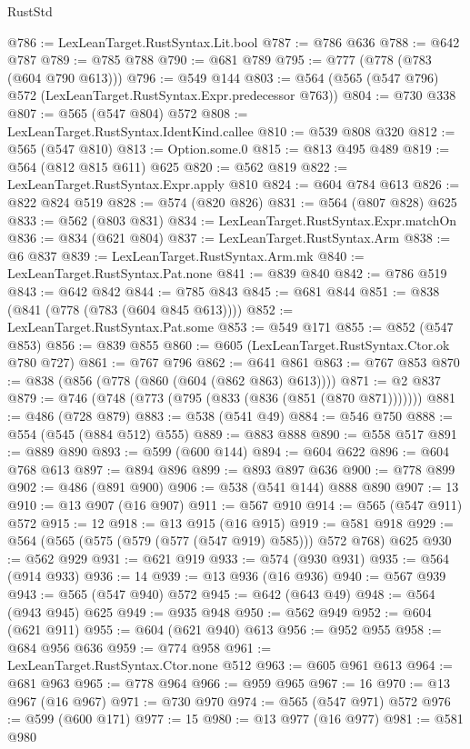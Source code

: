 \begin{lexlean}{RustStd}
\begin{coremodule}
{\begin{coremodule}
{{{{{{{{{{{{{@786 := LexLeanTarget.RustSyntax.Lit.bool
@787 := @786 @636
@788 := @642 @787
@789 := @785 @788
@790 := @681 @789
@795 := @777 (@778 (@783 (@604 @790 @613)))
@796 := @549 @144
@803 := @564 (@565 (@547 @796) @572 (LexLeanTarget.RustSyntax.Expr.predecessor @763))
@804 := @730 @338
@807 := @565 (@547 @804) @572
@808 := LexLeanTarget.RustSyntax.IdentKind.callee
@810 := @539 @808 @320
@812 := @565 (@547 @810)
@813 := Option.some.{0}
@815 := @813 @495 @489
@819 := @564 (@812 @815 @611) @625
@820 := @562 @819
@822 := LexLeanTarget.RustSyntax.Expr.apply @810
@824 := @604 @784 @613
@826 := @822 @824 @519
@828 := @574 (@820 @826)
@831 := @564 (@807 @828) @625
@833 := @562 (@803 @831)
@834 := LexLeanTarget.RustSyntax.Expr.matchOn
@836 := @834 (@621 @804)
@837 := LexLeanTarget.RustSyntax.Arm
@838 := @6 @837
@839 := LexLeanTarget.RustSyntax.Arm.mk
@840 := LexLeanTarget.RustSyntax.Pat.none
@841 := @839 @840
@842 := @786 @519
@843 := @642 @842
@844 := @785 @843
@845 := @681 @844
@851 := @838 (@841 (@778 (@783 (@604 @845 @613))))
@852 := LexLeanTarget.RustSyntax.Pat.some
@853 := @549 @171
@855 := @852 (@547 @853)
@856 := @839 @855
@860 := @605 (LexLeanTarget.RustSyntax.Ctor.ok @780 @727)
@861 := @767 @796
@862 := @641 @861
@863 := @767 @853
@870 := @838 (@856 (@778 (@860 (@604 (@862 @863) @613))))
@871 := @2 @837
@879 := @746 (@748 (@773 (@795 (@833 (@836 (@851 (@870 @871)))))))
@881 := @486 (@728 @879)
@883 := @538 (@541 @49)
@884 := @546 @750
@888 := @554 (@545 (@884 @512) @555)
@889 := @883 @888
@890 := @558 @517
@891 := @889 @890
@893 := @599 (@600 @144)
@894 := @604 @622
@896 := @604 @768 @613
@897 := @894 @896
@899 := @893 @897 @636
@900 := @778 @899
@902 := @486 (@891 @900)
@906 := @538 (@541 @144) @888 @890
@907 := 13
@910 := @13 @907 (@16 @907)
@911 := @567 @910
@914 := @565 (@547 @911) @572
@915 := 12
@918 := @13 @915 (@16 @915)
@919 := @581 @918
@929 := @564 (@565 (@575 (@579 (@577 (@547 @919) @585))) @572 @768) @625
@930 := @562 @929
@931 := @621 @919
@933 := @574 (@930 @931)
@935 := @564 (@914 @933)
@936 := 14
@939 := @13 @936 (@16 @936)
@940 := @567 @939
@943 := @565 (@547 @940) @572
@945 := @642 (@643 @49)
@948 := @564 (@943 @945) @625
@949 := @935 @948
@950 := @562 @949
@952 := @604 (@621 @911)
@955 := @604 (@621 @940) @613
@956 := @952 @955
@958 := @684 @956 @636
@959 := @774 @958
@961 := LexLeanTarget.RustSyntax.Ctor.none @512
@963 := @605 @961 @613
@964 := @681 @963
@965 := @778 @964
@966 := @959 @965
@967 := 16
@970 := @13 @967 (@16 @967)
@971 := @730 @970
@974 := @565 (@547 @971) @572
@976 := @599 (@600 @171)
@977 := 15
@980 := @13 @977 (@16 @977)
@981 := @581 @980
}}}}}}}}}}}}}
\end{coremodule}}
\end{coremodule}
\end{lexlean}
